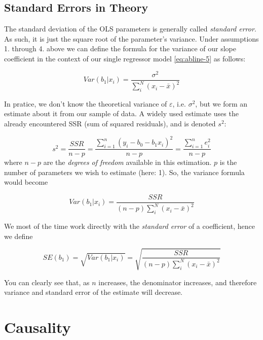 \documentclass[]{book}
\begin{document}
\hypertarget{se-theory}{%
\section{Standard Errors in Theory}\label{se-theory}}

The standard deviation of the OLS parameters is generally called \emph{standard error}. As such, it is just the square root of the parameter's variance.
Under assumptions 1. through 4. above we can define the formula for the variance of our slope coefficient in the context of our single regressor model \eqref{eq:abline-5} as follows:

\begin{equation}
Var(b_1|x_i) = \frac{\sigma^2}{\sum_i^N (x_i - \bar{x})^2}  \label{eq:var-ols}
\end{equation}

In pratice, we don't know the theoretical variance of \(\varepsilon\), i.e. \(\sigma^2\), but we form an estimate about it from our sample of data. A widely used estimate uses the already encountered SSR (sum of squared residuals), and is denoted \(s^2\):

\[
s^2 = \frac{SSR}{n-p} = \frac{\sum_{i=1}^n (y_i - b_0 - b_1 x_i)^2}{n-p} =  \frac{\sum_{i=1}^n e_i^2}{n-p}
\]
where \(n-p\) are the \emph{degrees of freedom} available in this estimation. \(p\) is the number of parameters we wish to estimate (here: 1). So, the variance formula would become

\begin{equation}
Var(b_1|x_i) = \frac{SSR}{(n-p)\sum_i^N (x_i - \bar{x})^2}  \label{eq:var-ols2}
\end{equation}

We most of the time work directly with the \emph{standard error} of a coefficient, hence we define

\begin{equation}
SE(b_1) = \sqrt{Var(b_1|x_i)} = \sqrt{\frac{SSR}{(n-p)\sum_i^N (x_i - \bar{x})^2}}  \label{eq:SE-ols2}
\end{equation}

You can clearly see that, as \(n\) increases, the denominator increases, and therefore variance and standard error of the estimate will decrease.

\hypertarget{causality}{%
\chapter{Causality}\label{causality}}
\end{document}
